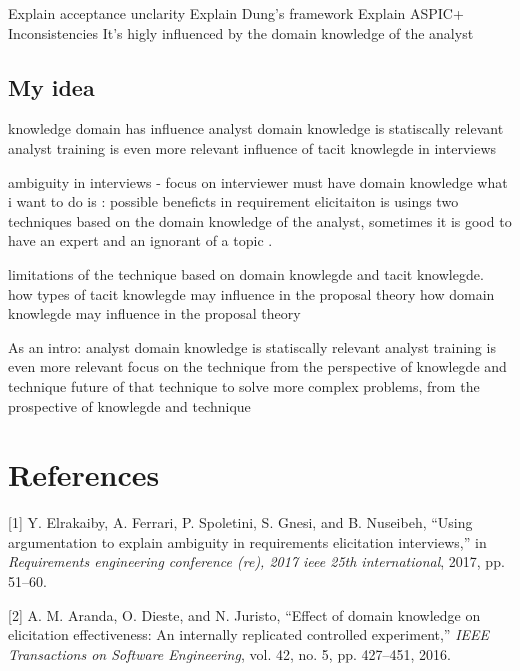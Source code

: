 \documentclass[]{llncs}
\begin{document}
Explain acceptance unclarity Explain Dung's framework Explain ASPIC+
Inconsistencies It's higly influenced by the domain knowledge of the
analyst

\hypertarget{my-idea}{%
\subsection{My idea}\label{my-idea}}

knowledge domain has influence analyst domain knowledge is statiscally
relevant analyst training is even more relevant influence of tacit
knowlegde in interviews

ambiguity in interviews - focus on interviewer must have domain
knowledge what i want to do is : possible beneficts in requirement
elicitaiton is usings two techniques based on the domain knowledge of
the analyst, sometimes it is good to have an expert and an ignorant of a
topic .

limitations of the technique based on domain knowlegde and tacit
knowlegde. how types of tacit knowlegde may influence in the proposal
theory how domain knowlegde may influence in the proposal theory

As an intro: analyst domain knowledge is statiscally relevant analyst
training is even more relevant focus on the technique from the
perspective of knowlegde and technique future of that technique to solve
more complex problems, from the prospective of knowlegde and technique

\newpage

\hypertarget{references}{%
\section*{References}\label{references}}

\hypertarget{refs}{}
\leavevmode\hypertarget{ref-elrakaiby2017using}{}%
{[}1{]} Y. Elrakaiby, A. Ferrari, P. Spoletini, S. Gnesi, and B.
Nuseibeh, ``Using argumentation to explain ambiguity in requirements
elicitation interviews,'' in \emph{Requirements engineering conference
(re), 2017 ieee 25th international}, 2017, pp. 51--60.

\leavevmode\hypertarget{ref-aranda2016effect}{}%
{[}2{]} A. M. Aranda, O. Dieste, and N. Juristo, ``Effect of domain
knowledge on elicitation effectiveness: An internally replicated
controlled experiment,'' \emph{IEEE Transactions on Software
Engineering}, vol. 42, no. 5, pp. 427--451, 2016.
\end{document}
